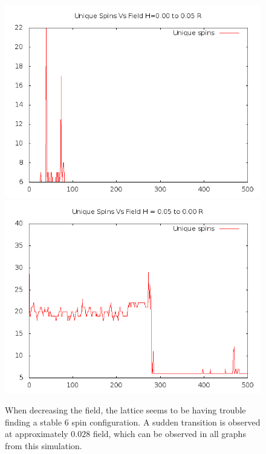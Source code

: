 \documentclass{article}
\begin{document}
\begin{figure}[ht]
\centering
\includegraphics[scale=0.5]{110/000to005RFreq.png}
\includegraphics[scale=0.5]{110/005to000RFreq.png}
\caption{When decreasing the field, the lattice seems to be having trouble finding a stable 6 spin configuration. A sudden transition is observed
at approximately 0.028 field, which can be observed in all graphs from this simulation.}
\end{figure}
\clearpage

\end{document}
